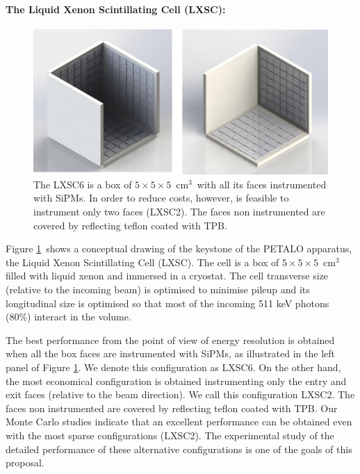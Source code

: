 \paragraph{The Liquid Xenon Scintillating Cell (LXSC):}

\label{sec.lxsc}

\begin{figure}[!htb]
	\centering
	\includegraphics[scale=0.5]{img/lxsc.png}
	\caption{\label{fig.box} The LXSC6 is a box of 
	$5\times 5 \times 5$~cm$^3$~with all its faces instrumented with SiPMs. In order to reduce costs, however, is feasible to instrument only two faces (LXSC2). The faces non instrumented are covered by reflecting teflon coated with TPB. }
\end{figure}

Figure \ref{fig.box}~shows a conceptual drawing of the keystone of the PETALO apparatus, the Liquid Xenon Scintillating Cell (LXSC). The cell is a box of $5\times 5 \times 5$~cm$^3$~ filled with liquid xenon and immersed in a cryostat. The cell transverse size (relative to the incoming beam) is optimised to minimise pileup and its longitudinal size is optimised so that most of the incoming 511 keV photons (80\%) interact in the volume. 

The best performance from the point of view of energy resolution is obtained when all the box faces are instrumented with SiPMs, as illustrated in the left panel of Figure \ref{fig.box}. We denote this configuration as LXSC6. On the other hand, the most economical configuration is obtained instrumenting only the entry and exit faces (relative to the beam direction). We call this configuration LXSC2. 
The faces non instrumented are covered by reflecting teflon coated with TPB. Our Monte Carlo studies indicate that an excellent performance can be obtained even with the most sparse configurations (LXSC2). The experimental study of the detailed performance of these alternative configurations is one of the goals of this proposal.  

